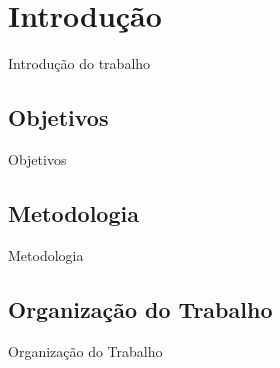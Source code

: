 \chapter{Introdução}
\label{chap:introducao}

Introdução do trabalho

\section{Objetivos}
\label{sec:objetivo}

Objetivos

\section{Metodologia}
\label{sec:metodologia}

Metodologia

\section{Organização do Trabalho}
\label{sec:organizacao_trabalho}

Organização do Trabalho